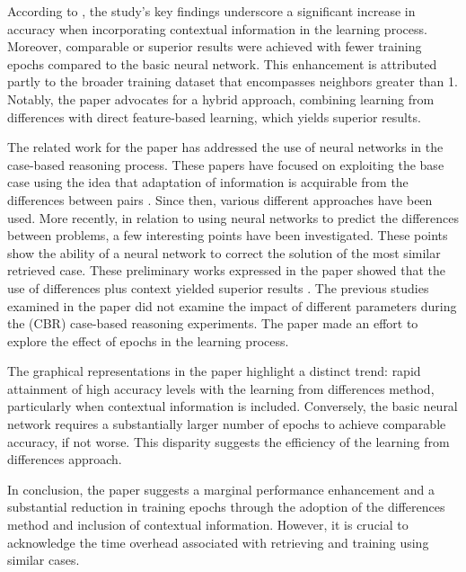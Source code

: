 \documentclass[a4paper, 12pt]{report}
\begin{document}
According to \cite{learningFromDifferences2022}, the study's key findings underscore a significant increase in accuracy when incorporating contextual information in the learning process. 
Moreover, comparable or superior results were achieved with fewer training epochs compared to the basic neural network. 
This enhancement is attributed partly to the broader training dataset that encompasses neighbors greater than 1. 
Notably, the paper advocates for a hybrid approach, combining learning from differences with direct feature-based learning, which yields superior results.

The related work for the paper \cite{learningFromDifferences2022} has addressed the use of neural networks in the case-based reasoning process. 
These papers have focused on exploiting the base case using the idea that adaptation of information is acquirable from the differences between pairs \cite{hanney1996learning}. 
Since then, various different approaches have been used. More recently, in relation to using neural networks to predict the differences between problems, 
a few interesting points have been investigated. These points show the ability of a neural network to correct the solution of the most similar retrieved case. 
These preliminary works expressed in the paper showed that the use of differences plus context yielded superior results \cite{craw2006learning}. 
The previous studies examined in the paper \cite{learningFromDifferences2022} did not examine the impact of different parameters during the (CBR) case-based reasoning experiments. 
The paper \cite{learningFromDifferences2022} made an effort to explore the effect of epochs in the learning process.

The graphical representations in the paper highlight a distinct trend: rapid attainment of high accuracy levels with the learning from differences method, 
particularly when contextual information is included. Conversely, the basic neural network requires a substantially larger number of epochs to achieve comparable accuracy, 
if not worse. This disparity suggests the efficiency of the learning from differences approach.

In conclusion, the paper suggests a marginal performance enhancement and a substantial reduction in training epochs through the adoption of the differences method 
and inclusion of contextual information. However, it is crucial to acknowledge the time overhead associated with retrieving and training using similar cases.
\end{document}
